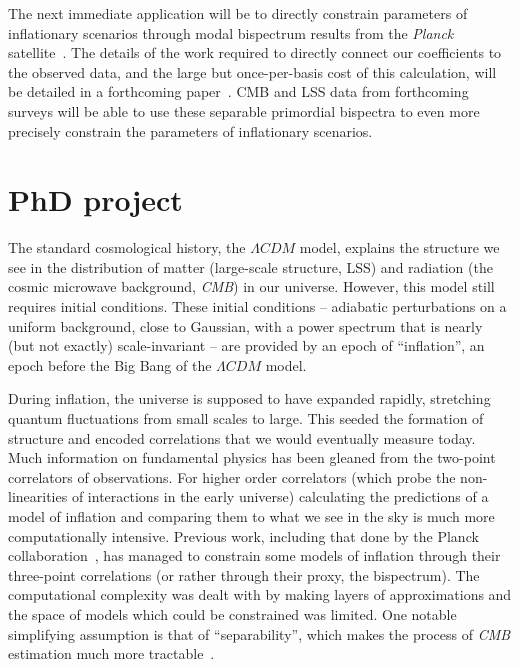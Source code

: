 The next immediate application will be to directly constrain parameters of
inflationary scenarios through modal bispectrum results from the \textit{Planck} satellite~\cite{Planck_NG_2018}.
The details of the work required to directly connect our coefficients to the observed data,
and the large but once-per-basis cost of this calculation, will be detailed in
a forthcoming paper~\cite{Sohn_2021}.
CMB and LSS data from forthcoming surveys will be able to use
these separable primordial bispectra to even more precisely constrain the
parameters of inflationary scenarios.

\section{PhD project}
The standard cosmological history, the $\Lambda CDM$ model, explains the structure we see in the distribution of matter (large-scale structure, LSS) and radiation (the cosmic microwave background, \textit{CMB}) in our universe. However, this model still requires initial conditions. These initial conditions – adiabatic perturbations on a uniform background, close to Gaussian, with a power spectrum that is nearly (but not exactly) scale-invariant – are provided by an epoch of “inflation”, an epoch before the Big Bang of the $\Lambda CDM$ model. 

During inflation, the universe is supposed to have expanded rapidly, stretching quantum fluctuations from small scales to large. This seeded the formation of structure and encoded correlations that we would eventually measure today.
Much information on fundamental physics has been gleaned from the two-point correlators of observations. For higher order correlators (which probe the non-linearities of interactions in the early universe) calculating the predictions of a model of inflation and comparing them to what we see in the sky is much more computationally intensive. Previous work, including that done by the Planck collaboration~\cite{Planck_NG_2018}, has managed to constrain some models of inflation through their three-point correlations (or rather through their proxy, the bispectrum).
The computational complexity was dealt with by making layers of approximations and the space
of models which could be constrained was limited.
One notable simplifying assumption is that of “separability”, which makes the process of \textit{CMB} estimation much more tractable~\cite{Komatsu_2005}.



